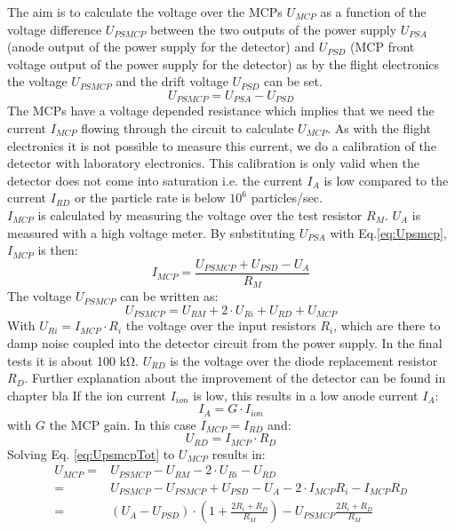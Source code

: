 		The aim is to calculate the voltage over the MCPs $U_{MCP}$ as a function of the voltage difference $U_{PSMCP}$ between the two outputs of the power supply $U_{PSA}$ (anode output of the power supply for the detector) and $U_{PSD}$ (MCP front voltage output of the power supply for the detector) as by the flight electronics the voltage $U_{PSMCP}$ and the drift voltage $U_{PSD}$ can be set.\\
		\begin{equation}
			U_{PSMCP} = U_{PSA} - U_{PSD}
			\label{eq:Upsmcp}
		\end{equation} %
		The MCPs have a voltage depended resistance which implies that we need the current $I_{MCP}$ flowing through the circuit to calculate $U_{MCP}$. As with the flight electronics it is not possible to measure this current, we do a calibration of the detector with laboratory electronics. This calibration is only valid when the detector does not come into saturation i.e. the current $I_A$ is low compared to the current $I_{RD}$ or the particle rate is below $10^6$ particles/sec.\\ %
		$I_{MCP}$ is calculated by measuring the voltage over the test resistor $R_M$. $U_A$ is measured with a high voltage meter. By substituting $U_{PSA}$ with Eq.\eqref{eq:Upsmcp}, $I_{MCP}$ is then:
		\begin{equation}
			I_{MCP} = \frac{U_{PSMCP} + U_{PSD}-U_A}{R_M}
		\end{equation}
		The voltage $U_{PSMCP}$ can be written as:
		\begin{equation}
			U_{PSMCP} = U_{RM} + 2\cdot U_{Ri} + U_{RD} + U_{MCP}
			\label{eq:UpsmcpTot}
		\end{equation}
		With $U_{Ri} = I_{MCP}\cdot R_i$ the voltage over the input resistors $R_i$, which are there to damp noise coupled into the detector circuit from the power supply. In the final tests it is about 100 \si{\kilo\ohm}. $U_{RD}$ is the voltage over the diode replacement resistor $R_D$. Further explanation about the improvement of the detector can be found in chapter bla %
		If the ion current $I_{ion}$ is low, this results in a low anode current $I_A$:
		\begin{equation}
			I_A = G\cdot I_{ion}
		\end{equation}
		with $G$ the MCP gain. %
		In this case $I_{MCP} = I_{RD}$ and:
		\begin{equation}
			U_{RD} = I_{MCP}\cdot R_D
		\end{equation}
		Solving Eq. \eqref{eq:UpsmcpTot} to $U_{MCP}$ results in:
		\begin{align}
			U_{MCP} =& U_{PSMCP} - U_{RM} - 2\cdot U_{Ri} - U_{RD}\\
			=& U_{PSMCP} - U_{PSMCP} + U_{PSD} - U_A - 2\cdot I_{MCP} R_i - I_{MCP} R_D\\
			=& (U_A - U_{PSD})\cdot(1 + \frac{2R_i + R_D}{R_M}) - U_{PSMCP}\frac{2R_i + R_D}{R_M}
		\end{align}
		
